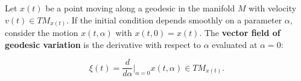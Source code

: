 Let $x(t)$ be a point moving along a geodesic in the manifold $M$ with velocity $v(t) \in TM_{x(t)}$. If the initial condition depends smoothly on a parameter $\alpha$, consider the motion $x(t, \alpha)$ with $x(t, 0) = x(t)$. The \textbf{vector field of geodesic variation} is the derivative with respect to $\alpha$ evaluated at $\alpha = 0$:

$$\xi(t) = \frac{d}{d\alpha} \bigg|_{\alpha=0} x(t, \alpha) \in TM_{x(t)}.$$
